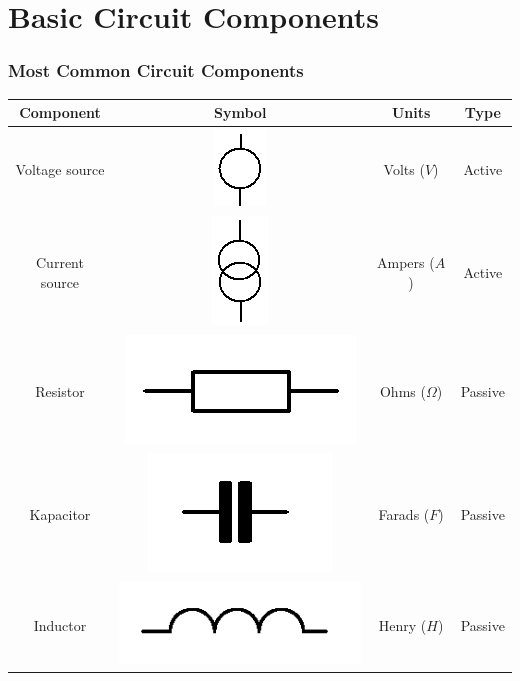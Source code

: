 \documentclass{beamer}
\begin{document}
\section{\texorpdfstring{Basic Circuit Components}{Basic Circuit Components}}
	\begin{frame}
    \frametitle{Most Common Circuit Components}
		\begin{center}
			\begin{tabular}{c | c | c | c}
				\hline
				\hline
				\textbf{Component} & \textbf{Symbol} & \textbf{Units} & \textbf{Type} \\
				\hline
			  Voltage source     & \includegraphics[scale=0.4]{zn_zdrojV.png} & Volts ($V$) & Active\\
				\hline
			  Current source     & \includegraphics[scale=0.4]{zn_zdrojA.png} & Ampers ($A$) & Active\\
				\hline
			  Resistor     & \includegraphics[scale=0.2]{zn_rezistor.png} & Ohms ($\Omega$) & Passive\\
				\hline
			  Kapacitor     & \includegraphics[scale=0.2]{zn_kondenzator.png} & Farads ($F$) & Passive\\
				\hline
			  Inductor     & \includegraphics[scale=0.2]{zn_indukcnost.png} & Henry ($H$) & Passive\\
				\hline
				\hline
			\end{tabular}
		\end{center}
  \end{frame}
\end{document}

